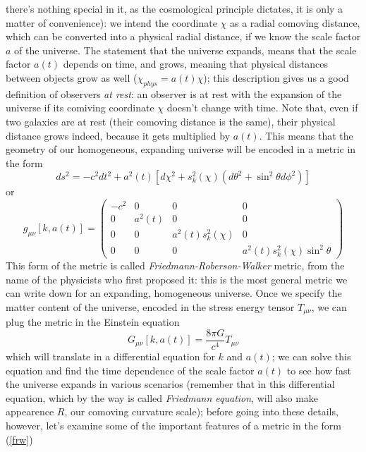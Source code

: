 there's nothing special in it, as the cosmological principle dictates, it is only a matter of convenience): we intend the coordinate $\chi$ as a radial comoving distance, which can be converted into a physical radial distance, if we know the scale factor $a$ of the universe. The statement that the universe expands, means that the scale factor $a(t)$ depends on time, and grows, meaning that physical distances between objects grow as well ($\chi_{phys}=a(t)\chi$); this description gives us a good definition of observers \textit{at rest}: an observer is at rest with the expansion of the universe if its comiving coordinate $\chi$ doesn't change with time. Note that, even if two galaxies are at rest (their comoving distance is the same), their physical distance grows indeed, because it gets multiplied by $a(t)$. This means that the geometry of our homogeneous, expanding universe will be encoded in a metric in the form 
\begin{equation}
\label{frw}
ds^2=-c^2dt^2+a^2(t)\left[d\chi^2+s^2_k(\chi)(d\theta^2 + \sin^2{\theta}d\phi^2)\right]
\end{equation}  
or 
\begin{equation}
g_{\mu\nu}[k,a(t)]=
\begin{pmatrix}
-c^2 & 0 & 0 & 0 \\
0 & a^2(t) & 0 & 0 \\
0 & 0 & a^2(t)s_k^2(\chi) & 0 \\
0 & 0 & 0 & a^2(t)s_k^2(\chi)\sin^2{\theta}
\end{pmatrix}
\end{equation}
This form of the metric is called \textit{Friedmann-Roberson-Walker} metric, from the name of the physicists who first proposed it: this is the most general metric we can write down for an expanding, homogeneous universe. Once we specify the matter content of the universe, encoded in the stress energy tensor $T_{\mu\nu}$, we can plug the metric in the Einstein equation
\begin{equation}
\label{einfried}
G_{\mu\nu}[k,a(t)]=\frac{8\pi G}{c^4}T_{\mu\nu}
\end{equation}
which will translate in a differential equation for $k$ and $a(t)$; we can solve this equation and find the time dependence of the scale factor $a(t)$ to see how fast the universe expands in various scenarios (remember that in this differential equation, which by the way is called \textit{Friedmann equation}, will also make appearence $R$, our comoving curvature scale); before going into these details, however, let's examine some of the important features of a metric in the form (\ref{frw})

